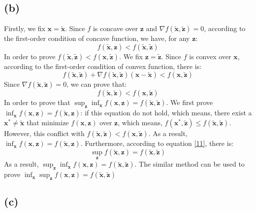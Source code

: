 \documentclass[10pt,a4paper]{article}
\begin{document}
\subsection*{(b)}
Firstly, we fix $\mathbf{x} = \tilde{\mathbf{x}}$. Since $f$ is concave over $\mathbf{z}$ and $\nabla f(\tilde{\mathbf{x}}, \tilde{\mathbf{z}}) = 0$, according to the first-order condition of concave function, we have, for any $\mathbf{z}$:
\begin{equation}
	f(\tilde{\mathbf{x}}, \mathbf{z}) < f(\tilde{\mathbf{x}}, \tilde{\mathbf{z}})
	\label{11}
\end{equation}
In order to prove $f(\tilde{\mathbf{x}}, \tilde{\mathbf{z}}) < f(\mathbf{x}, \tilde{\mathbf{z}})$. We fix $\mathbf{z} = \tilde{\mathbf{z}}$. Since $f$ is convex over $\mathbf{x}$, according to the first-order condition of convex function, there is:
\begin{equation*}
	f(\tilde{\mathbf{x}}, \tilde{\mathbf{z}}) + \nabla f(\tilde{\mathbf{x}}, \tilde{\mathbf{z}}) (\mathbf{x} - \tilde{\mathbf{x}}) < f(\mathbf{x}, \tilde{\mathbf{z}})
\end{equation*}
Since $\nabla f(\tilde{\mathbf{x}}, \tilde{\mathbf{z}}) = 0$, we can prove that:
\begin{equation*}
	f(\tilde{\mathbf{x}}, \tilde{\mathbf{z}}) < f(\mathbf{x}, \tilde{\mathbf{z}})
\end{equation*}
In order to prove that $\displaystyle\sup_{\mathbf{z}} \displaystyle\inf_{\mathbf{x}}f(\mathbf{x}, \mathbf{z}) = f(\tilde{\mathbf{x}}, \tilde{\mathbf{z}})$. We first prove $\displaystyle\inf_{\mathbf{x}}f(\mathbf{x}, \mathbf{z}) = f(\tilde{\mathbf{x}}, \mathbf{z})$: if this equation do not hold, which means, there exist a $\mathbf{x^{*}} \neq \tilde{\mathbf{x}}$ that minimize $f(\mathbf{x}, \mathbf{z})$ over $\mathbf{z}$, which means, $f(\mathbf{x}^{*}, \tilde{\mathbf{z}}) \leq f(\tilde{\mathbf{x}}, \tilde{\mathbf{z}})$. However, this conflict with $f(\tilde{\mathbf{x}}, \tilde{\mathbf{z}}) < f(\mathbf{x}, \tilde{\mathbf{z}})$. As a result, $\displaystyle\inf_{\mathbf{x}}f(\mathbf{x}, \mathbf{z}) = f(\tilde{\mathbf{x}}, \mathbf{z})$. Furthermore, according to equation \ref{11}, there is:
\begin{equation*}
	\displaystyle\sup_{\mathbf{z}} f(\tilde{\mathbf{x}}, \mathbf{z}) = f(\tilde{\mathbf{x}}, \tilde{\mathbf{z}})
\end{equation*}
As a result, $\displaystyle\sup_{\mathbf{z}} \displaystyle\inf_{\mathbf{x}}f(\mathbf{x}, \mathbf{z}) = f(\tilde{\mathbf{x}}, \tilde{\mathbf{z}})$. The similar method can be used  to prove $\displaystyle\inf_{\mathbf{x}}\sup_{\mathbf{z}} f(\mathbf{x}, \mathbf{z}) = f(\tilde{\mathbf{x}}, \tilde{\mathbf{z}})$

\subsection*{(c)}
\end{document}
